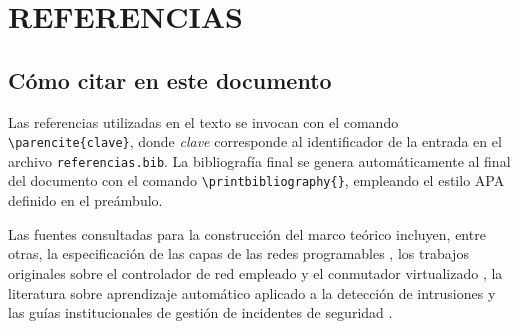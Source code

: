 \chapter{REFERENCIAS}
\thispagestyle{empty}

%
%
%
%

\section{C\'omo citar en este documento}

Las referencias utilizadas en el texto se invocan con el comando \verb|\parencite{clave}|,
donde \emph{clave} corresponde al identificador de la entrada en el archivo
\verb|referencias.bib|. La bibliograf\'ia final se genera autom\'aticamente al
final del documento con el comando \verb|\printbibliography{}|, empleando el
estilo APA definido en el pre\'ambulo.

Las fuentes consultadas para la construcci\'on del marco te\'orico incluyen,
entre otras, la especificaci\'on de las capas de las redes programables
\parencite{rfc7426}, los trabajos originales sobre el controlador de red empleado
\parencite{kubo2014ryu,ryudocs} y el conmutador virtualizado \parencite{openvswitch2015},
la literatura sobre aprendizaje autom\'atico
aplicado a la detecci\'on de intrusiones \parencite{lightgbm2017} y las gu\'ias
institucionales de gesti\'on de incidentes de seguridad \parencite{nist80061r2,nistcsf20}.
